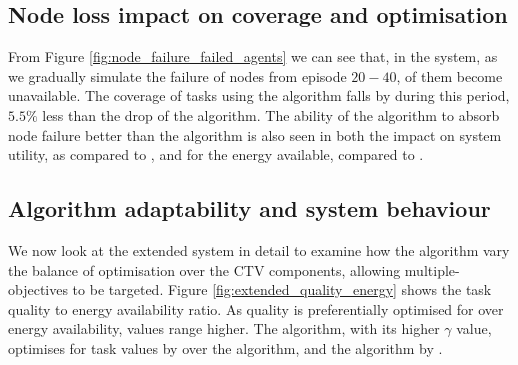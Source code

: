 \subsection{Node loss impact on coverage and optimisation}

From Figure \ref{fig:node_failure_failed_agents} we can see that, in the \simulationNodeFailure{}{} system, as we gradually simulate the failure of nodes from episode $20-40$,  \resultsNodeFailureFailedAgentsBalancedDiff{}{} of them become unavailable. The coverage  of tasks using the \algorithmBalanced{}{} algorithm falls by \resultsNodeFailureCoverageBalancedDiff{}{} during this period, $5.5\%$ less than the \resultsNodeFailureCoverageQRoutingDiff{}{} drop of the \algorithmQRouting{}{} algorithm. The ability of the \algorithmBalanced{}{} algorithm to absorb node failure better than the \algorithmQRouting{}{} algorithm is also seen in both the impact on system utility, \resultsNodeFailureCTVBalancedImpactDiff{}{} as compared to \resultsNodeFailureCTVQRoutingImpactDiff{}{}, and for the energy available, \resultsNodeFailureCTVBalancedImpactDiff{}{} compared to \resultsNodeFailureCTVQRoutingImpactDiff{}{}.


\subsection{Algorithm adaptability and system behaviour}

We now look at the extended system in detail to examine how the algorithm vary the balance  of optimisation over the CTV components, allowing multiple-objectives to be targeted. Figure 	\ref{fig:extended_quality_energy} shows the task quality to energy availability ratio. 
As quality is preferentially optimised for over energy availability, values range higher. The \algorithmQuality{}{} algorithm, with its higher $\gamma$ value, optimises for task values by \resultsQEQualityEnd{}{} over the \algorithmEnergy{}{} algorithm, and the \algorithmDistribution{}{} algorithm by \resultsQEDistDiff{}{}. 

